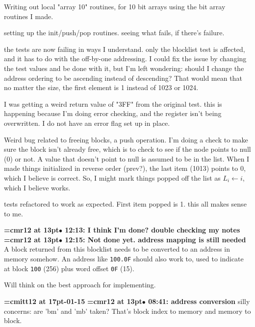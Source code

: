 Writing out local "array 10" routines, for 10 bit arrays using the bit array routines I made.
\par

setting up the init/push/pop routines. seeing what fails, if there's failure.
\par

the tests are now failing in ways I understand. only the blocklist test is affected, and it has to do with the off-by-one addressing. I could fix the issue by changing the test values and be done with it, but I'm left wondering: should I change the address ordering to be ascending instead of descending? That would mean that no matter the size, the first element is 1 instead of 1023 or 1024.
\par

I was getting a weird return value of "3FF" from the original test. this is happening because I'm doing error checking, and the register isn't being overwritten. I do not have an error flag set up in place.
\par

Weird bug related to freeing blocks, a push operation. I'm doing a check to make sure the block isn't already free, which is to check to see if the node points to null (0) or not. A value that doesn't point to null is assumed to be in the list. When I made things initialized in reverse order (prev?), the last item (1013) points to 0, which I believe is correct. So, I might mark things popped off the list  as $L_i \leftarrow i$, which I believe works.
\par

tests refactored to work as expected. First item popped is 1. this all makes sense to me.
\par

{\smallskip\noindent\bf\font\titlefont=cmr12 at 13pt\titlefont $\bullet$ 12:13: I think I'm done? double checking my notes}\smallskip
{\smallskip\noindent\bf\font\titlefont=cmr12 at 13pt\titlefont $\bullet$ 12:15: Not done yet. address mapping is still needed}\smallskip
A block returned from this blocklist needs to be converted to an address in memory somehow. An address like {\tt 100.0F} should also work to, used to indicate at block {\tt 100} (256) plus word offset {\tt 0F} (15).
\par

Will think on the best approach for implementing.
\par

{\medskip\noindent\bf\font\titlefont=cmitt12 at 17pt-01-15}\medskip
{\smallskip\noindent\bf\font\titlefont=cmr12 at 13pt\titlefont $\bullet$ 08:41: address conversion}\smallskip
silly concerns: are 'bm' and 'mb' taken? That's block index to memory and memory to block.
\par

